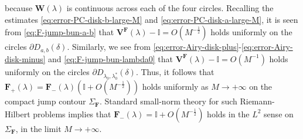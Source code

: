 because $\mathbf{W}(\lambda)$ is continuous across each of the four circles. Recalling the estimates \eqref{eq:error-PC-disk-b-large-M} and \eqref{eq:error-PC-disk-a-large-M}, it is seen from \eqref{eq:F-jump-bun-a-b} that $\mathbf{V}^\mathbf{F}(\lambda) - \mathbb{I} = O(M^{-\frac{1}{2}})$ holds uniformly on the circles $\partial D_{a,b}(\delta)$. Similarly, we see from \eqref{eq:error-Airy-disk-plus}-\eqref{eq:error-Airy-disk-minus} and \eqref{eq:F-jump-bun-lambda0} that $\mathbf{V}^\mathbf{F}(\lambda) - \mathbb{I} = O(M^{-1})$ holds uniformly on the circles $\partial D_{\lambda_0, \lambda_0^*}(\delta)$. Thus, it follows that $ \mathbf{F}_+(\lambda) = \mathbf{F}_-(\lambda)( \mathbb{I} + O(M^{-\frac{1}{2}}))$ holds uniformly as $M\to+\infty$ on the compact jump contour $\Sigma_\mathbf{F}$. Standard small-norm theory for such Riemann-Hilbert problems implies that $\mathbf{F}_-(\lambda) = \mathbb{I} + O(M^{-\frac{1}{2}})$ holds in the $L^2$ sense on $\Sigma_\mathbf{F}$, in the limit $M\to +\infty$.


